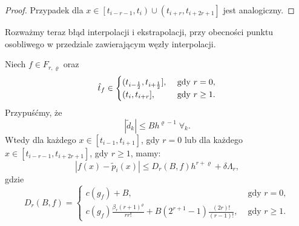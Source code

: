 \documentclass[oik, pdftex, robocza, man]{mgrwms}
\begin{document}
\begin{proof}
        \noindent
        Przypadek dla $x \in \left[ t_{i-r-1}, t_{i} \right) \cup \left( t_{i+r}, t_{i+2r+1} \right]$ jest analogiczny.
    \end{proof}

    Rozważmy teraz błąd interpolacji i ekstrapolacji, przy obecności punktu osobliwego w przedziale zawierającym węzły interpolacji.

    \begin{lemma} \label{lem:algMP_3}
        Niech $f \in F_{r, \varrho}$ oraz 
        \begin{equation*}
            \hat{t}_{f} \in \begin{cases}
                (t_{i-\frac{1}{2}}, t_{i + \frac{1}{2}}],    &\text{ gdy } r=0, \\
                (t_{i}, t_{i + r}],                          &\text{ gdy } r \geq 1. \\
            \end{cases}
        \end{equation*}
        Przypuśćmy, że 
        \begin{equation} \label{eq:2}
            |\tilde{d}_{k}| \leq Bh^{\varrho-1} \; \forall_{k}.
        \end{equation}
        Wtedy dla każdego $x \in [t_{i-1}, t_{i+1}]$, gdy $r=0$ lub dla każdego $x \in [t_{i-r-1}, t_{i+2r+1}]$, gdy $r \geq 1$, mamy:
        \begin{equation*}
            |f(x) - \tilde{p}_{i}(x)| \leq D_{r}(B, f)h^{r+\varrho} + \delta\Lambda_{r},
        \end{equation*}
        gdzie 
        \begin{equation*}
            D_{r}(B, f)=\begin{cases} 
                c(g_{f}) + B,   &\text { gdy } r = 0, \\
                c(g_{f}) \frac{\beta_{r}(r+1)^{\varrho}}{r r !}+B\left(2^{r+1}-1\right) \frac{(2 r) !}{(r-1) !},    &\text { gdy } r \geq 1.
            \end{cases}
        \end{equation*}
    \end{lemma}
\end{document}
